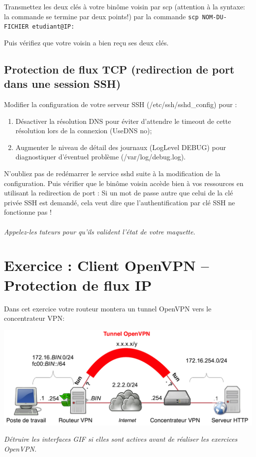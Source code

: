 \documentclass[a4paper,11pt]{article}
\makeatletter
\newcommand{\shellcmd}[1]{\texttt{#1}}
\newcommand{\nospace}[1]{\nofrench@punctuation\texttt{#1}\french@punctuation}
\makeatother
\begin{document}
Transmettez les deux clés à votre binôme voisin par scp (attention à la syntaxe: la commande se termine par deux points!) par la commande \shellcmd{\nospace{scp~NOM-DU-FICHIER~etudiant@IP:}}

Puis vérifiez que votre voisin a bien reçu ses deux clés.

\subsection{Protection de flux TCP (redirection de port dans une session SSH)}
Modifier la configuration de votre serveur SSH (/etc/ssh/sshd\_config) pour :
\begin{enumerate}
\item Désactiver la résolution DNS pour éviter d'attendre le timeout de cette résolution lors de la connexion (UseDNS no);
\item Augmenter le niveau de détail des journaux (LogLevel DEBUG) pour diagnostiquer d'éventuel problème (/var/log/debug.log).
\end{enumerate}
N'oubliez pas de redémarrer le service sshd suite à la modification de la configuration.
Puis vérifier que le binôme voisin accède bien à vos ressources en utilisant la redirection de port : Si un mot de passe autre que celui de la clé privée SSH est demandé, cela veut dire que l'authentification par clé SSH ne fonctionne pas !
\\\\\emph{Appelez-les tuteurs pour qu'ils valident l'état de votre maquette.}
\section{Exercice : Client OpenVPN – Protection de flux IP}
Dans cet exercice votre routeur montera un tunnel OpenVPN vers le concentrateur VPN:
\begin{center}
\includegraphics[width=\linewidth]{Tunnel-OpenVPN}
\end{center}
\emph{Détruire les interfaces GIF si elles sont actives avant de réaliser les exercices OpenVPN.}
\end{document}
